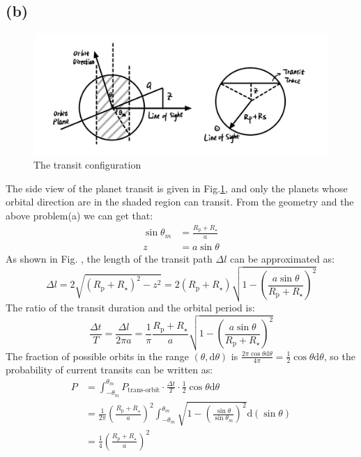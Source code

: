 \documentclass[a4paper,12pt]{article}
\begin{document}
\subsection*{(b)}
\begin{figure}[htbp]
    \centering
    \includegraphics[width=14cm]{trainsit.jpg}
    \caption{The transit configuration}
    \label{transit}
\end{figure}
The side view of the planet transit is given in Fig.\ref{transit}, and only the planets whose 
orbital direction are in the shaded region can transit. From the geometry and the above problem(a) 
we can get that:
\begin{align*}
    \sin\theta_m & = \frac{R_{\text{p}} + R_{\star}}{a} \\
    z &= a \sin \theta
\end{align*}
As shown in Fig. , the length of the transit path $\Delta l$ can be approximated as:
\begin{equation}
    \Delta l  =2\sqrt{(R_{\text{p}} + R_{\star})^2 - z^2} = 2(R_{\text{p}} + R_{\star}) \sqrt{1 - (\frac{a \sin \theta}{R_{\text{p}} + R_{\star}})^2}
\end{equation}
The ratio of the transit duration and the orbital period is:
\begin{equation} 
    \frac{\Delta t}{T} = \frac{\Delta l}{2\pi a} = \frac{1}{\pi} \frac{R_{\text{p}} + R_{\star}}{a} \sqrt{1 - (\frac{a \sin \theta}{R_{\text{p}} + R_{\star}})^2}
\end{equation}
The fraction of possible orbits in the range $(\theta, \text{d}\theta)$ is $\frac{2\pi \cos \theta \text{d}\theta}{4 \pi} = \frac{1}{2}\cos \theta \text{d}\theta$,
so the probability of current transits can be written as:
\begin{align*}
    P &= \int_{-\theta_m}^{\theta_m} P_{\text{trans-orbit}}  \cdot \frac{\Delta t}{T} \cdot \frac{1}{2}\cos \theta \text{d}\theta  \\
     & = \frac{1}{2\pi} (\frac{R_{\text{p}} + R_{\star}}{a})^2 \int_{-\theta_m}^{\theta_m} \sqrt{1 - (\frac{\sin \theta}{\sin \theta_m})^2} \text{d} (\sin \theta) \\
     & = \frac{1}{4} (\frac{R_{\text{p}} + R_{\star}}{a})^2
\end{align*}
\end{document}
